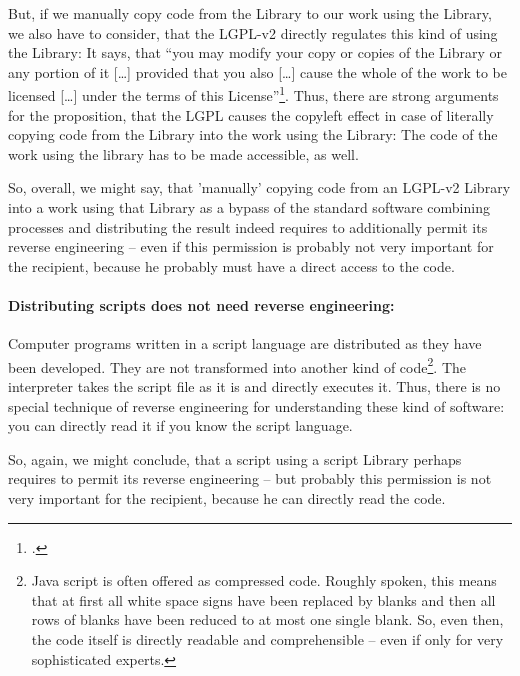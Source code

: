 But, if we manually copy code from the Library to our work using the Library, we
also have to consider, that the LGPL-v2 directly regulates this kind of using
the Library: It says, that \enquote{you may modify your copy or copies of the
Library or any portion of it [\ldots] provided that you also [\ldots] cause the
whole of the work to be licensed [\ldots] under the terms of this
License}\footcite[cf.][\nopage wp., §2, escpcially §2c]{Lgpl21OsiLicense1999a}.
Thus, there are strong arguments for the proposition, that the LGPL causes the
copyleft effect in case of literally copying code from the Library into the work
using the Library: The code of the work using the library has to be made
accessible, as well.

So, overall, we might say, that 'manually' copying code from an LGPL-v2 Library
into a work using that Library as a bypass of the standard software combining
processes and distributing the result indeed requires to additionally permit its
reverse engineering -- even if this permission is probably not very important
for the recipient, because he probably must have a direct access to the code.

\paragraph{Distributing scripts does not need reverse engineering:}
\label{RevEngDistributeScripts}
Computer programs written in a script language are distributed as they have been
developed. They are not transformed into another kind of code\footnote{Java
script is often offered as compressed code. Roughly spoken, this means that at
first all white space signs have been replaced by blanks and then all rows of
blanks have been reduced to at most one single blank. So, even then, the code
itself is directly readable and comprehensible -- even if only for very
sophisticated experts.}. The interpreter takes the script file as it is and
directly executes it. Thus, there is no special technique of reverse engineering
for understanding these kind of software: you can directly read it if you know
the script language.

So, again, we might conclude, that a script using a script Library perhaps
requires to permit its reverse engineering -- but probably this permission is
not very important for the recipient, because he can directly read the code.

